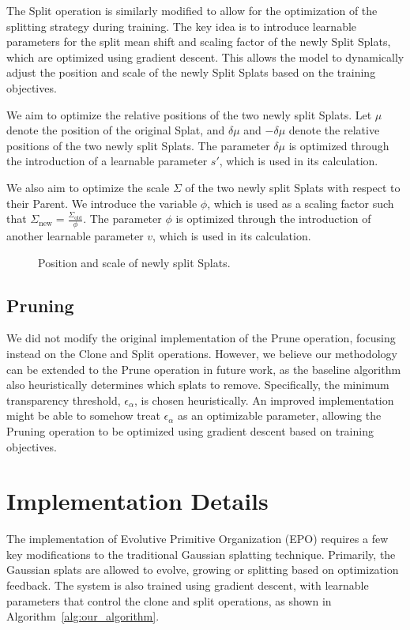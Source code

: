 \documentclass[11pt]{report}
\begin{document}
The Split operation is similarly modified to allow for the optimization of the splitting strategy during training. The key idea is to introduce learnable parameters for the split mean shift and scaling factor of the newly Split Splats, which are optimized using gradient descent. This allows the model to dynamically adjust the position and scale of the newly Split Splats based on the training objectives.

We aim to optimize the relative positions of the two newly split Splats. Let $\mu$ denote the position of the original Splat, and $\delta \mu$ and $- \delta \mu$ denote the relative positions of the two newly split Splats. The parameter $\delta \mu$ is optimized through the introduction of a learnable parameter $s'$, which is used in its calculation.

We also aim to optimize the scale $\Sigma$ of the two newly split Splats with respect to their Parent. We introduce the variable $\phi$, which is used as a scaling factor such that $\Sigma_{\text{new}} = \frac{\Sigma_{\text{old}}}{\phi}$. The parameter $\phi$ is optimized through the introduction of another learnable parameter $v$, which is used in its calculation.

\begin{figure}[ht]
    \centering
    
    \caption{Position and scale of newly split Splats.}
    \label{fig:split}
\end{figure}

\subsection{Pruning}
\label{subsec:improved_pruning}

We did not modify the original implementation of the Prune operation, focusing instead on the Clone and Split operations. However, we believe our methodology can be extended to the Prune operation in future work, as the baseline algorithm also heuristically determines which splats to remove. Specifically, the minimum transparency threshold, $\epsilon_{\alpha}$, is chosen heuristically. An improved implementation might be able to somehow treat $\epsilon_{\alpha}$ as an optimizable parameter, allowing the Pruning operation to be optimized using gradient descent based on training objectives.

\section{Implementation Details}
The implementation of Evolutive Primitive Organization (EPO) requires a few key modifications to the traditional Gaussian splatting technique. Primarily, the Gaussian splats are allowed to evolve, growing or splitting based on optimization feedback. The system is also trained using gradient descent, with learnable parameters that control the clone and split operations, as shown in Algorithm~\ref{alg:our_algorithm}.
\end{document}
